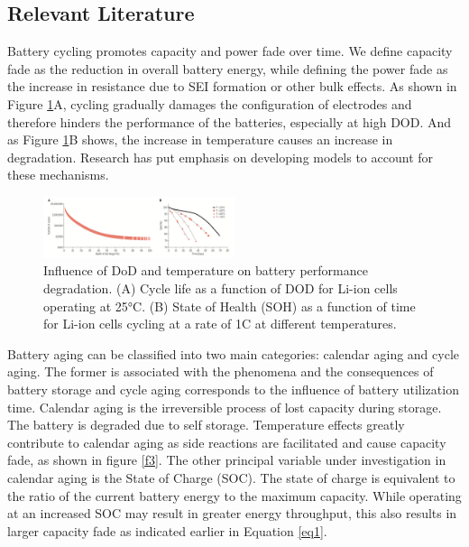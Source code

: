 \documentclass[10]{IEEEtran}
\begin{document}
	\subsection{Relevant Literature}
	Battery cycling promotes capacity and power fade over time. We define capacity fade as the reduction in overall battery energy, while defining the power fade as the increase in resistance due to SEI formation or other bulk effects. As shown in Figure \ref{f2}A, cycling gradually damages the configuration of electrodes and therefore hinders the performance of the batteries, especially at high DOD. And as Figure \ref{f2}B shows, the increase in temperature causes an increase in degradation. Research has put emphasis on developing models to account for these mechanisms. 
	
	\begin{figure}[htbp]
		\centerline{\includegraphics[keepaspectratio,height=0.5\textheight, width=0.5\textwidth]{fig3.png}}
		\caption{Influence of DoD and temperature on battery performance degradation. (A) Cycle life as a function of DOD for Li-ion cells operating at 25°C. (B) State of Health (SOH) as a function of time for Li-ion cells cycling at a rate of 1C at different temperatures.\cite{b1}}
		\label{f2}
	\end{figure}
	
	Battery aging can be classified into two main categories: calendar aging and cycle aging.\cite{b6} The former is associated with the phenomena and the consequences of battery storage and cycle aging corresponds to the influence of battery utilization time. Calendar aging is the irreversible process of lost capacity during storage. The battery is degraded due to self storage.  Temperature effects greatly contribute to calendar aging as side reactions are facilitated and cause capacity fade, as shown in figure \ref{f3}. The other principal variable under investigation in calendar aging is the State of Charge (SOC). The state of charge is equivalent to the ratio of the current battery energy to the maximum capacity. While operating at an increased SOC may result in greater energy throughput, this also results in larger capacity fade as indicated earlier in Equation \ref{eq1}.
	
\end{document}
